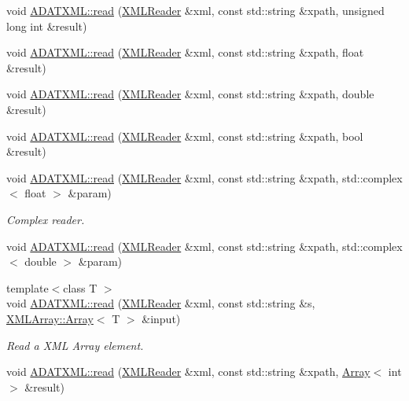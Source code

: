\begin{DoxyCompactItemize}
\item 
void \mbox{\hyperlink{group__io_ga91e3d97bb48b2257dba32262f49d5758}{A\+D\+A\+T\+X\+M\+L\+::read}} (\mbox{\hyperlink{classADATXML_1_1XMLReader}{X\+M\+L\+Reader}} \&xml, const std\+::string \&xpath, unsigned long int \&result)
\item 
void \mbox{\hyperlink{group__io_ga1a88a7d3e3dbac33c732e580f8c23302}{A\+D\+A\+T\+X\+M\+L\+::read}} (\mbox{\hyperlink{classADATXML_1_1XMLReader}{X\+M\+L\+Reader}} \&xml, const std\+::string \&xpath, float \&result)
\item 
void \mbox{\hyperlink{group__io_ga75127d89932656a5224dd747b14ca897}{A\+D\+A\+T\+X\+M\+L\+::read}} (\mbox{\hyperlink{classADATXML_1_1XMLReader}{X\+M\+L\+Reader}} \&xml, const std\+::string \&xpath, double \&result)
\item 
void \mbox{\hyperlink{group__io_ga9309cae5bd0340cc4ed71055808b6fac}{A\+D\+A\+T\+X\+M\+L\+::read}} (\mbox{\hyperlink{classADATXML_1_1XMLReader}{X\+M\+L\+Reader}} \&xml, const std\+::string \&xpath, bool \&result)
\item 
void \mbox{\hyperlink{group__io_ga1287217ff7c9cbae6a6c958ee2de7776}{A\+D\+A\+T\+X\+M\+L\+::read}} (\mbox{\hyperlink{classADATXML_1_1XMLReader}{X\+M\+L\+Reader}} \&xml, const std\+::string \&xpath, std\+::complex$<$ float $>$ \&param)
\begin{DoxyCompactList}\small\item\em Complex reader. \end{DoxyCompactList}\item 
void \mbox{\hyperlink{group__io_gaf79f2861a8d55a3e88311959e646b0e1}{A\+D\+A\+T\+X\+M\+L\+::read}} (\mbox{\hyperlink{classADATXML_1_1XMLReader}{X\+M\+L\+Reader}} \&xml, const std\+::string \&xpath, std\+::complex$<$ double $>$ \&param)
\item 
{\footnotesize template$<$class T $>$ }\\void \mbox{\hyperlink{group__io_gae46a9532d6b16b2a3dc58d889eb1d688}{A\+D\+A\+T\+X\+M\+L\+::read}} (\mbox{\hyperlink{classADATXML_1_1XMLReader}{X\+M\+L\+Reader}} \&xml, const std\+::string \&s, \mbox{\hyperlink{classXMLArray_1_1Array}{X\+M\+L\+Array\+::\+Array}}$<$ T $>$ \&input)
\begin{DoxyCompactList}\small\item\em Read a X\+ML Array element. \end{DoxyCompactList}\item 
void \mbox{\hyperlink{group__io_gaeaed8077b8bee4f4277ea0cc8cc13744}{A\+D\+A\+T\+X\+M\+L\+::read}} (\mbox{\hyperlink{classADATXML_1_1XMLReader}{X\+M\+L\+Reader}} \&xml, const std\+::string \&xpath, \mbox{\hyperlink{classXMLArray_1_1Array}{Array}}$<$ int $>$ \&result)

\end{DoxyCompactItemize}

